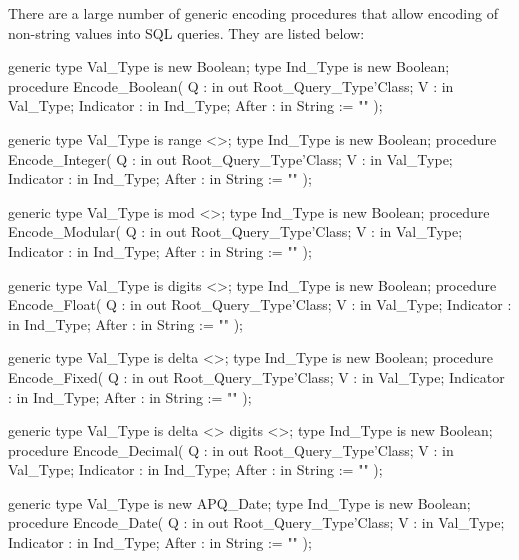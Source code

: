 \documentclass[english,letterpaper]{book}
\begin{document}
There are a large number of generic encoding procedures that 
allow encoding of non-string values into SQL queries. They are
listed below:

\begin{Code}
generic
   type Val_Type is new Boolean;
   type Ind_Type is new Boolean;
procedure Encode_Boolean(
   Q :         in out Root_Query_Type'Class;
   V :         in     Val_Type;
   Indicator : in     Ind_Type;
   After :     in     String := ""
);
\end{Code}

\begin{Code}
generic
   type Val_Type is range <>;
   type Ind_Type is new Boolean;
procedure Encode_Integer(
   Q :         in out Root_Query_Type'Class;
   V :         in     Val_Type;
   Indicator : in     Ind_Type;
   After :     in     String := ""
);
\end{Code}

\begin{Code}
generic
   type Val_Type is mod <>;
   type Ind_Type is new Boolean;
procedure Encode_Modular(
   Q :         in out Root_Query_Type'Class;
   V :         in     Val_Type;
   Indicator : in     Ind_Type;
   After :     in     String := ""
);
\end{Code}

\begin{Code}
generic
   type Val_Type is digits <>;
   type Ind_Type is new Boolean;
procedure Encode_Float(
   Q :         in out Root_Query_Type'Class;
   V :         in     Val_Type;
   Indicator : in     Ind_Type;
   After :     in     String := ""
);
\end{Code}

\begin{Code}
generic
   type Val_Type is delta <>;
   type Ind_Type is new Boolean;
procedure Encode_Fixed(
   Q :         in out Root_Query_Type'Class;
   V :         in     Val_Type;
   Indicator : in     Ind_Type;
   After :     in     String := ""
);
\end{Code}

\begin{Code}
generic
   type Val_Type is delta <> digits <>;
   type Ind_Type is new Boolean;
procedure Encode_Decimal(
   Q :         in out Root_Query_Type'Class;
   V :         in     Val_Type;
   Indicator : in     Ind_Type;
   After :     in     String := ""
);
\end{Code}

\begin{Code}
generic
   type Val_Type is new APQ_Date;
   type Ind_Type is new Boolean;
procedure Encode_Date(
   Q :         in out Root_Query_Type'Class;
   V :         in     Val_Type;
   Indicator : in     Ind_Type;
   After :     in     String := ""
);
\end{Code}
\end{document}
